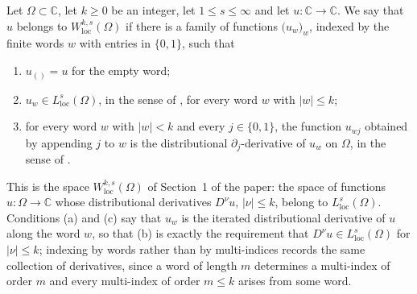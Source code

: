 \begin{definition}
Let $\Omega\subset\mathbb{C}$, let $k\ge0$ be an integer, let
$1\le s\le\infty$ and let $u\colon\mathbb{C}\to\mathbb{C}$.  We say that $u$
belongs to $W^{k,s}_{\mathrm{loc}}(\Omega)$ if there is a family of functions
$\bigl(u_w\bigr)_w$, indexed by the finite words $w$ with entries in
$\{0,1\}$, such that
\begin{enumerate}
\item[(a)] $u_{()}=u$ for the empty word;
\item[(b)] $u_w\in L^s_{\mathrm{loc}}(\Omega)$, in the sense of
, for every word $w$ with $|w|\le k$;
\item[(c)] for every word $w$ with $|w|<k$ and every $j\in\{0,1\}$, the
function $u_{wj}$ obtained by appending $j$ to $w$ is the distributional
$\partial_j$-derivative of $u_w$ on $\Omega$, in the sense of
.
\end{enumerate}

This is the space $W^{k,s}_{\mathrm{loc}}(\Omega)$ of Section~1 of the paper:
the space of functions $u\colon\Omega\to\mathbb{C}$ whose distributional
derivatives $D^\nu u$, $|\nu|\le k$, belong to $L^s_{\mathrm{loc}}(\Omega)$.
Conditions (a) and (c) say that $u_w$ is the iterated distributional
derivative of $u$ along the word $w$, so that (b) is
exactly the requirement that $D^\nu u\in L^s_{\mathrm{loc}}(\Omega)$ for
$|\nu|\le k$; indexing by words rather than by multi-indices records the same
collection of derivatives, since a word of length $m$ determines a
multi-index of order $m$ and every multi-index of order $m\le k$ arises from
some word.
\end{definition}
